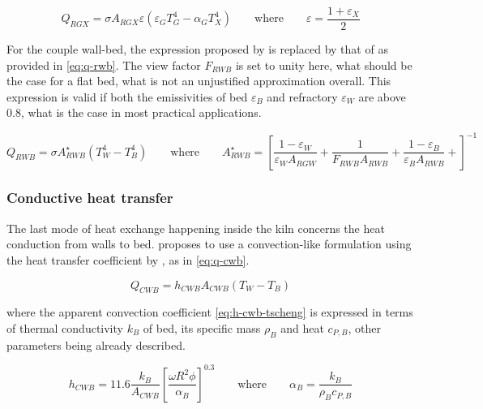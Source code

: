 \documentclass[11pt]{paper}
\begin{document}
\begin{equation}
Q_{RGX} = \sigma{}A_{RGX}\varepsilon\left(\varepsilon_{G}T_{G}^4-\alpha_{G}T_{X}^4\right)
\qquad\text{where}\qquad{}
\varepsilon=\frac{1+\varepsilon_{X}}{2}
\label{eq:q-rgx}
\end{equation}

For the couple wall-bed, the expression proposed by \textcite{Mujumdar2006i} is replaced by that of \textcite{Hanein2017} as provided in \eqref{eq:q-rwb}. The view factor $F_{RWB}$ is set to unity here, what should be the case for a flat bed, what is not an unjustified approximation overall. This expression is valid if both the emissivities of bed $\varepsilon_{B}$ and refractory $\varepsilon_{W}$ are above 0.8, what is the case in most practical applications.

\begin{equation}
Q_{RWB} = \sigma{}A_{RWB}^{\star}\left(T_{W}^4-T_{B}^4\right)
\qquad\text{where}\qquad{}
A_{RWB}^{\star}=\left[
\frac{1-\varepsilon_{W}}{\varepsilon_{W}A_{RGW}}+
\frac{1}{F_{RWB}A_{RWB}}+
\frac{1-\varepsilon_{B}}{\varepsilon_{B}A_{RWB}}+
\right]^{-1}
\label{eq:q-rwb}
\end{equation}

\subsubsection*{Conductive heat transfer}

The last mode of heat exchange happening inside the kiln concerns the heat conduction from walls to bed. \textcite{Mujumdar2006i} proposes to use a convection-like formulation using the heat transfer coefficient by \textcite{Tscheng1979}, as in \eqref{eq:q-cwb}.

\begin{equation}
Q_{CWB} = h _{CWB}A_{CWB}\left(T_{W}-T_{B}\right)
\label{eq:q-cwb}
\end{equation}

\noindent{}where the apparent convection coefficient \eqref{eq:h-cwb-tscheng} is expressed in terms of thermal conductivity $k_{B}$ of bed, its specific mass $\rho_{B}$ and heat $c_{P,B}$, other parameters being already described.

\begin{equation}
h _{CWB}=11.6\frac{k_{B}}{A_{CWB}}\left[\frac{\omega{}R^2\phi}{\alpha_{B}}\right]^{0.3}
\qquad\text{where}\qquad{}
\alpha_{B}=\frac{k_{B}}{\rho_{B}c_{P,B}}
\label{eq:h-cwb-tscheng}
\end{equation}
\end{document}
